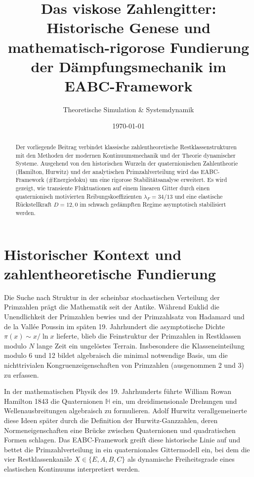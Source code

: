 \documentclass[11pt,a4paper]{article}
\title{\textbf{Das viskose Zahlengitter: Historische Genese und mathematisch-rigorose Fundierung der Dämpfungsmechanik im EABC-Framework}}
\author{Theoretische Simulation \& Systemdynamik}
\date{\today}
\begin{document}
	\maketitle
	
	\begin{abstract}
		Der vorliegende Beitrag verbindet klassische zahlentheoretische Restklassenstrukturen mit den Methoden der modernen Kontinuumsmechanik und der Theorie dynamischer Systeme. Ausgehend von den historischen Wurzeln der quaternionischen Zahlentheorie (Hamilton, Hurwitz) und der analytischen Primzahlverteilung wird das EABC-Framework (\#Energiedoku) um eine rigorose Stabilitätsanalyse erweitert. Es wird gezeigt, wie transiente Fluktuationen auf einem linearen Gitter durch einen quaternionisch motivierten Reibungskoeffizienten $\lambda_F = 34/13$ und eine elastische Rückstellkraft $D = 12{,}0$ im schwach gedämpften Regime asymptotisch stabilisiert werden.
	\end{abstract}
	
	\section{Historischer Kontext und zahlentheoretische Fundierung}
	
	Die Suche nach Struktur in der scheinbar stochastischen Verteilung der Primzahlen prägt die Mathematik seit der Antike. Während Euklid die Unendlichkeit der Primzahlen bewies und der Primzahlsatz von Hadamard und de la Vallée Poussin im späten 19. Jahrhundert die asymptotische Dichte $\pi(x) \sim x / \ln x$ lieferte, blieb die Feinstruktur der Primzahlen in Restklassen modulo $N$ lange Zeit ein ungelöstes Terrain. Insbesondere die Klasseneinteilung modulo 6 und 12 bildet algebraisch die minimal notwendige Basis, um die nichttrivialen Kongruenzeigenschaften von Primzahlen (ausgenommen 2 und 3) zu erfassen.
	
	In der mathematischen Physik des 19. Jahrhunderts führte William Rowan Hamilton 1843 die Quaternionen $\mathbb{H}$ ein, um dreidimensionale Drehungen und Wellenausbreitungen algebraisch zu formulieren. Adolf Hurwitz verallgemeinerte diese Ideen später durch die Definition der Hurwitz-Ganzzahlen, deren Normeneigenschaften eine Brücke zwischen Quaternionen und quadratischen Formen schlagen. Das EABC-Framework greift diese historische Linie auf und bettet die Primzahlverteilung in ein quaternionales Gittermodell ein, bei dem die vier Restklassenkanäle $X \in \{E, A, B, C\}$ als dynamische Freiheitsgrade eines elastischen Kontinuums interpretiert werden.
	
\end{document}
